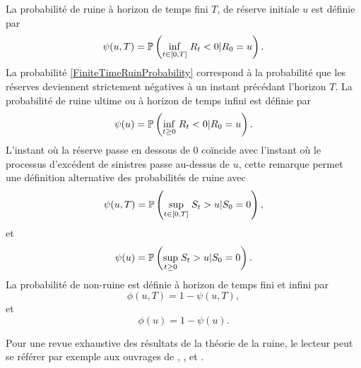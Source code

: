 \begin{Def}\label{RuinProbabilityDefinition}
La probabilité de ruine à horizon de temps fini $T$, de réserve initiale $u$ est définie par 
\begin{equation}\label{FiniteTimeRuinProbability}
\psi(u,T)=\mathbb{P}\left(\underset{t\in[0,T]}{\inf}\hspace{0.1cm}R_{t}<0|R_{0}=u\right).
\end{equation}
La probabilité \eqref{FiniteTimeRuinProbability} correspond à la probabilité que les réserves deviennent strictement négatives à un instant précédant l'horizon $T$. La probabilité de ruine ultime ou à horizon de temps infini est définie par  
\begin{equation}\label{UltimateRuinProbability}
\psi(u)=\mathbb{P}\left(\underset{t\geq0}{\inf}\hspace{0.1cm}R_{t}<0|R_{0}=u\right).
\end{equation}
L'instant où la réserve passe en dessous de $0$ coïncide avec l'instant où le processus d'excédent de sinistres passe au-dessus de $u$, cette remarque permet une définition alternative des probabilités de ruine avec
\begin{equation}
\psi(u,T)=\mathbb{P}\left(\underset{t\in[0,T]}{\sup}\hspace{0.1cm}S_{t}>u|S_{0}=0\right), \nonumber
\end{equation}
et
\begin{equation}
\psi(u)=\mathbb{P}\left(\underset{t\geq0}{\sup}\hspace{0.1cm}S_{t}>u|S_{0}=0\right). \nonumber
\end{equation}
La probabilité de non-ruine est définie à horizon de temps fini et infini par 
\begin{equation}
\phi(u,T)=1-\psi(u,T) \nonumber,
\end{equation}
et
\begin{equation}
\phi(u)=1-\psi(u). \nonumber
\end{equation}
\end{Def}
Pour une revue exhaustive des résultats de la  théorie de la ruine, le lecteur peut se référer par exemple aux ouvrages de \citet{Gr91}, \citet{RoScScTe99}, et \citet{AsAl10}.\\ 

